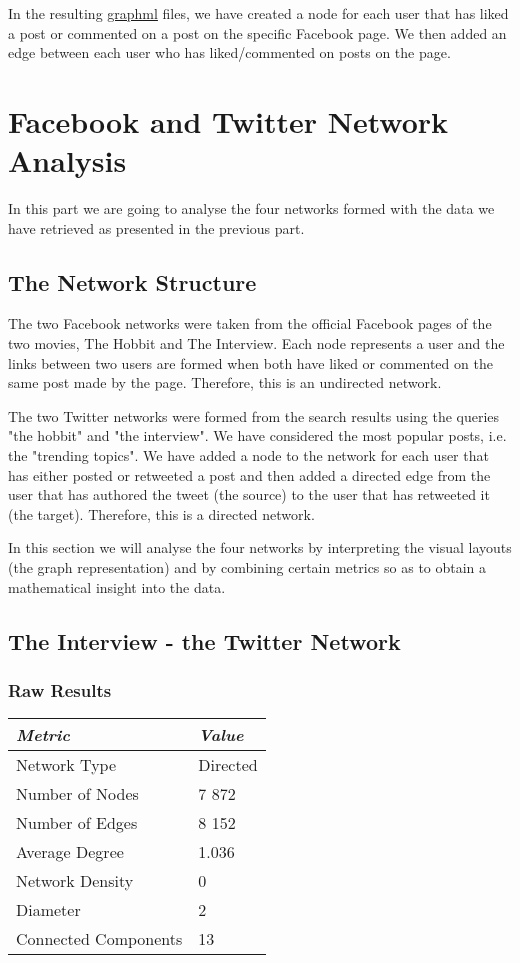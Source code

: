 \documentclass{llncs}
\begin{document}
In the resulting \href{http://graphml.graphdrawing.org/}{graphml} files, we have
created a node for each user that has liked a post or commented on a post on the
specific Facebook page. We then added an edge between each user who has
liked/commented on posts on the page.
%
\section{Facebook and Twitter Network Analysis}
In this part we are going to analyse the four networks formed with the data we
have retrieved as presented in the previous part.
%
\subsection{The Network Structure}
The two Facebook networks were taken from the official Facebook pages of the two
movies, The Hobbit and The Interview. Each node represents a user and the
links between two users are formed when both have liked or commented on the same
post made by the page. Therefore, this is an undirected network.

The two Twitter networks were formed from the search results using the queries
"the hobbit" and "the interview". We have considered the most popular posts,
i.e. the "trending topics". We have added a node to the network for each user
that has either posted or retweeted a post and then added a directed edge from
the user that has authored the tweet (the source) to the user that has retweeted
it (the target). Therefore, this is a directed network.

In this section we will analyse the four networks by interpreting the visual
layouts (the graph representation) and by combining certain metrics so as to
obtain a mathematical insight into the data.
%
\subsection{The Interview - the Twitter Network}
\subsubsection{Raw Results}
\begin{center}
    \begin{tabular}{ l | l }
        \hline
        \textit{Metric} & \textit{Value} \\ \hline
        Network Type & Directed \\ \hline
        Number of Nodes & 7 872 \\ \hline
        Number of Edges & 8 152 \\ \hline
        Average Degree & 1.036 \\ \hline
        Network Density & 0 \\ \hline
        Diameter & 2 \\ \hline
        Connected Components & 13 \\
        \hline
    \end{tabular}
\end{center}
%
\end{document}
